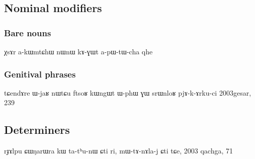 %
%
%
%
%
%
%
%
%
%
%

\subsection{Nominal modifiers}

\subsubsection{Bare nouns}
χsɤr a-kɯmtɕhɯ nɯnɯ kɤ-ɣɯt a-pɯ-tɯ-cha qhe
\subsubsection{Genitival phrases}

tɕendɤre ɯ-jaʁ nɯtɕu ftsoʁ kɯngɯt ɯ-phɯ ɣɯ srɯnloʁ pjɤ-k-ɤrku-ci
2003gesar, 239

\subsection{Determiners} \label{sec:determiners}
 rɟɤlpu ɕɯŋarɯra kɯ ta-tʰu-nɯ ɕti ri, mɯ-tɤ-nɤla-j ɕti tɕe,
 2003 qachga, 71